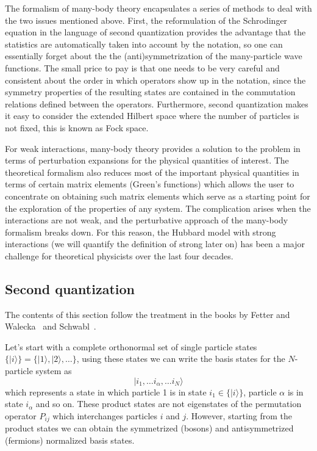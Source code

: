 \documentclass[11pt,letter]{article}
\begin{document}
The formalism of many-body theory encapsulates a series of methods to deal with
the two issues mentioned above.   First, the reformulation of the Schrodinger
equation in the language of second quantization provides the advantage that the
statistics are automatically taken into account by the notation, so one can
essentially forget about the the (anti)symmetrization of the many-particle wave
functions.  The small price to pay is that one needs to be very careful and
consistent about the order in which operators show up in the notation, since
the symmetry properties of the resulting states are contained in the
commutation relations defined between the operators.  Furthermore, second
quantization makes it easy to consider the extended Hilbert space where the
number of particles is not fixed, this is known as Fock space. 

For weak interactions, many-body theory provides a solution to the problem in
terms of perturbation expansions for the physical quantities of interest.   The
theoretical formalism also reduces most of the important physical quantities in
terms of certain matrix elements (Green's functions) which allows the user to
concentrate on obtaining such matrix elements which serve as a starting point
for the exploration of the properties of any system.   The complication arises
when the interactions are not weak, and the perturbative approach of the
many-body formalism breaks down.   For this reason, the Hubbard model with strong
interactions (we will quantify the definition of strong later on) has been a
major challenge for theoretical physicists over the last four decades. 
 


\subsection{Second quantization}

The contents of this section follow the treatment in the books by Fetter and
Walecka~\cite{fetter2003quantum} and Schwabl~\cite{schwabl2005advanced}.  

Let's start with a complete orthonormal set of single particle states $\lbrace
|i\rangle \rbrace = \lbrace |1\rangle, |2\rangle, \ldots \rbrace$, using these
states we can write the basis states for the $N$-particle system as
\begin{equation}
   | i_{1}, \ldots i_{\alpha}, \ldots i_{N} \rangle  
\end{equation} 
which represents a state in which particle 1 is in state $i_{1} \in \lbrace
|i\rangle \rbrace$, particle $\alpha$ is in state $i_{\alpha}$ and so on.
These product states are not eigenstates of the permutation operator $P_{ij}$
which interchanges particles $i$ and $j$.  However, starting from the product
states we can obtain the symmetrized (bosons) and antisymmetrized (fermions)
normalized basis states.   
\end{document}
